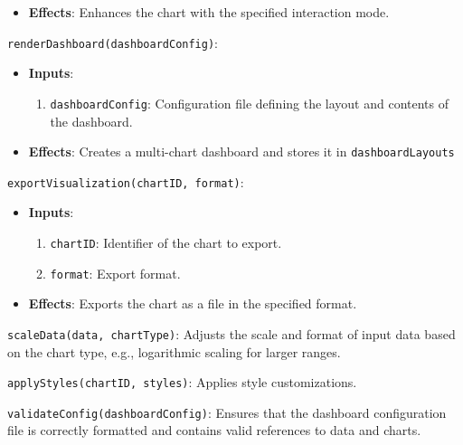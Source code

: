\documentclass[12pt, titlepage]{article}
\begin{document}
\begin{description}
\begin{itemize}
    \item \textbf{Effects}: Enhances the chart with the specified interaction mode.
  \end{itemize}

  \item \texttt{renderDashboard(dashboardConfig)}:
  \begin{itemize}
    \item \textbf{Inputs}:
    \begin{enumerate}
      \item \texttt{dashboardConfig}: Configuration file defining the layout and contents of 
      the dashboard.
    \end{enumerate}

    \item \textbf{Effects}: Creates a multi-chart dashboard and stores it in \texttt{dashboardLayouts}
  \end{itemize}

  \item \texttt{exportVisualization(chartID, format)}:
  \begin{itemize}
    \item \textbf{Inputs}:
    \begin{enumerate}
      \item \texttt{chartID}: Identifier of the chart to export.
      \item \texttt{format}: Export format.
    \end{enumerate}

    \item \textbf{Effects}: Exports the chart as a file in the specified format.
  \end{itemize}

  \item[Local Function:]
  \item \texttt{scaleData(data, chartType)}: Adjusts the scale and format of input data based on 
  the chart type, e.g., logarithmic scaling for larger ranges.
  \item \texttt{applyStyles(chartID, styles)}: Applies style customizations.
  \item \texttt{validateConfig(dashboardConfig)}: Ensures that the dashboard configuration file is 
  correctly formatted and contains valid references to data and charts.
\end{description}
\end{document}
